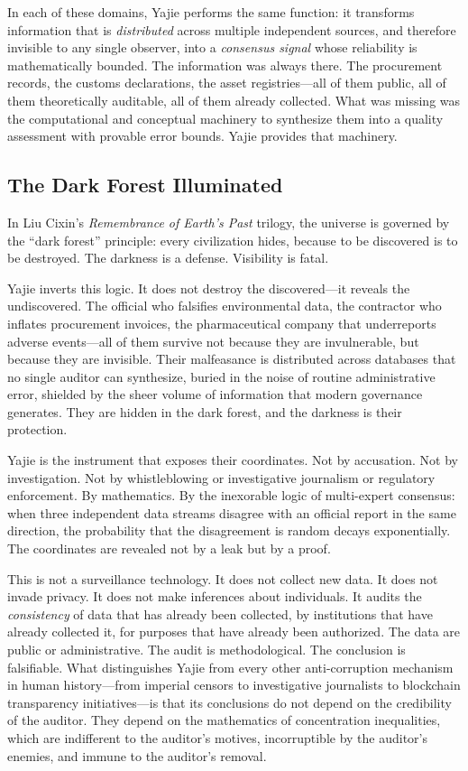 \documentclass[12pt,a4paper]{ctexart}
\theoremstyle{definition}
\theoremstyle{remark}
\begin{document}
In each of these domains, Yajie performs the same function: it transforms information that is \textit{distributed} across multiple independent sources, and therefore invisible to any single observer, into a \textit{consensus signal} whose reliability is mathematically bounded. The information was always there. The procurement records, the customs declarations, the asset registries—all of them public, all of them theoretically auditable, all of them already collected. What was missing was the computational and conceptual machinery to synthesize them into a quality assessment with provable error bounds. Yajie provides that machinery.

\subsection{The Dark Forest Illuminated}

In Liu Cixin's \textit{Remembrance of Earth's Past} trilogy, the universe is governed by the ``dark forest'' principle: every civilization hides, because to be discovered is to be destroyed. The darkness is a defense. Visibility is fatal.

Yajie inverts this logic. It does not destroy the discovered—it reveals the undiscovered. The official who falsifies environmental data, the contractor who inflates procurement invoices, the pharmaceutical company that underreports adverse events—all of them survive not because they are invulnerable, but because they are invisible. Their malfeasance is distributed across databases that no single auditor can synthesize, buried in the noise of routine administrative error, shielded by the sheer volume of information that modern governance generates. They are hidden in the dark forest, and the darkness is their protection.

Yajie is the instrument that exposes their coordinates. Not by accusation. Not by investigation. Not by whistleblowing or investigative journalism or regulatory enforcement. By mathematics. By the inexorable logic of multi-expert consensus: when three independent data streams disagree with an official report in the same direction, the probability that the disagreement is random decays exponentially. The coordinates are revealed not by a leak but by a proof.

This is not a surveillance technology. It does not collect new data. It does not invade privacy. It does not make inferences about individuals. It audits the \textit{consistency} of data that has already been collected, by institutions that have already collected it, for purposes that have already been authorized. The data are public or administrative. The audit is methodological. The conclusion is falsifiable. What distinguishes Yajie from every other anti-corruption mechanism in human history—from imperial censors to investigative journalists to blockchain transparency initiatives—is that its conclusions do not depend on the credibility of the auditor. They depend on the mathematics of concentration inequalities, which are indifferent to the auditor's motives, incorruptible by the auditor's enemies, and immune to the auditor's removal.
\end{document}
